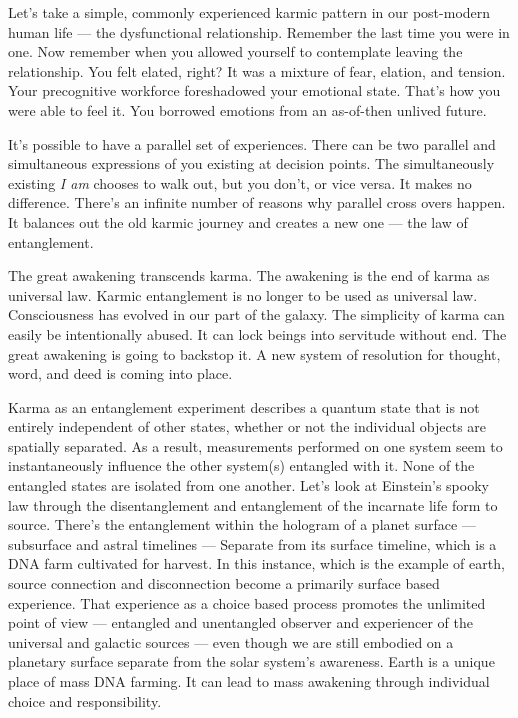 Let's take a simple, commonly experienced karmic pattern in our
post-modern human life --- the dysfunctional relationship. Remember the
last time you were in one. Now remember when you allowed yourself to
contemplate leaving the relationship. You felt elated, right? It was a
mixture of fear, elation, and tension. Your precognitive workforce
foreshadowed your emotional state. That's how you were able to feel it.
You borrowed emotions from an as-of-then unlived future.

It's possible to have a parallel set of experiences. There can be two
parallel and simultaneous expressions of you existing at decision
points. The simultaneously existing \emph{I am} chooses to walk out, but
you don't, or vice versa. It makes no difference. There's an infinite
number of reasons why parallel cross overs happen. It balances out the
old karmic journey and creates a new one --- the law of entanglement.

The great awakening transcends karma. The awakening is the end of karma
as universal law. Karmic entanglement is no longer to be used as
universal law. Consciousness has evolved in our part of the galaxy. The
simplicity of karma can easily be intentionally abused. It can lock
beings into servitude without end. The great awakening is going to
backstop it. A new system of resolution for thought, word, and deed is
coming into place.

Karma as an entanglement experiment describes a quantum state that is
not entirely independent of other states, whether or not the individual
objects are spatially separated. As a result, measurements performed on
one system seem to instantaneously influence the other system(s)
entangled with it. None of the entangled states are isolated from one
another. Let's look at Einstein's spooky law through the disentanglement
and entanglement of the incarnate life form to source. There's the
entanglement within the hologram of a planet surface --- subsurface and
astral timelines --- Separate from its surface timeline, which is a DNA
farm cultivated for harvest. In this instance, which is the example of
earth, source connection and disconnection become a primarily surface
based experience. That experience as a choice based process promotes the
unlimited point of view --- entangled and unentangled observer and
experiencer of the universal and galactic sources --- even though we are
still embodied on a planetary surface separate from the solar system's
awareness. Earth is a unique place of mass DNA farming. It can lead to
mass awakening through individual choice and responsibility.

